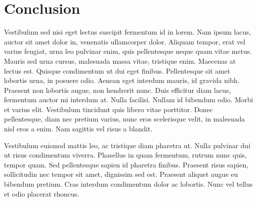 \chapter{Conclusion}
Vestibulum sed nisi eget lectus suscipit fermentum id in lorem. Nam ipsum lacus, auctor sit amet dolor in, venenatis ullamcorper dolor. Aliquam tempor, erat vel varius feugiat, urna leo pulvinar enim, quis pellentesque neque quam vitae metus. Mauris sed urna cursus, malesuada massa vitae, tristique enim. Maecenas at lectus est. Quisque condimentum ut dui eget finibus. Pellentesque sit amet lobortis urna, in posuere odio. Aenean eget interdum mauris, id gravida nibh. Praesent non lobortis augue, non hendrerit nunc. Duis efficitur diam lacus, fermentum auctor mi interdum at. Nulla facilisi. Nullam id bibendum odio. Morbi et varius elit. Vestibulum tincidunt quis libero vitae porttitor. Donec pellentesque, diam nec pretium varius, nunc eros scelerisque velit, in malesuada nisl eros a enim. Nam sagittis vel risus a blandit.

Vestibulum euismod mattis leo, ac tristique diam pharetra ut. Nulla pulvinar dui ut risus condimentum viverra. Phasellus in quam fermentum, rutrum nunc quis, tempor quam. Sed pellentesque sapien id pharetra finibus. Praesent risus sapien, sollicitudin nec tempor sit amet, dignissim sed est. Praesent aliquet augue eu bibendum pretium. Cras interdum condimentum dolor ac lobortis. Nunc vel tellus et odio placerat rhoncus.